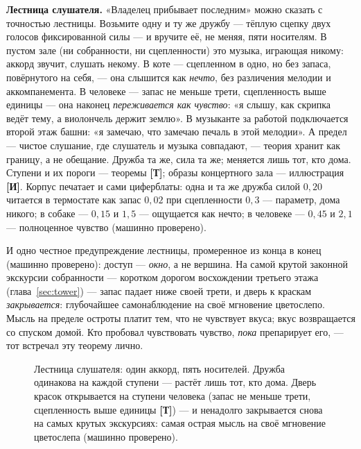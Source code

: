 \documentclass[11pt,letterpaper]{article}
\newcommand{\stT}{\textbf{[Т]}\xspace}
\newcommand{\stI}{\textbf{[И]}\xspace}
\begin{document}
\textbf{Лестница слушателя.} «Владелец прибывает последним» можно
сказать с точностью лестницы. Возьмите одну и ту же дружбу ---
тёплую сцепку двух голосов фиксированной силы --- и вручите её, не
меняя, пяти носителям. В пустом зале (ни собранности, ни
сцепленности) это музыка, играющая никому: аккорд звучит, слушать
некому. В коте --- сцепленном в одно, но без запаса, повёрнутого на
себя, --- она слышится как \emph{нечто}, без различения мелодии и
аккомпанемента. В человеке --- запас не меньше трети, сцепленность
выше единицы --- она наконец \emph{переживается как чувство}: «я
слышу, как скрипка ведёт тему, а виолончель держит землю». В
музыканте за работой подключается второй этаж башни: «я замечаю,
что замечаю печаль в этой мелодии». А предел --- чистое слушание,
где слушатель и музыка совпадают, --- теория хранит как границу, а
не обещание. Дружба та же, сила та же; меняется лишь тот, кто дома.
Ступени и их пороги --- теоремы \stT; образы концертного зала ---
иллюстрация \stI. Корпус печатает и сами циферблаты: одна и та же
дружба силой $0{,}20$ читается в термостате как запас $0{,}02$ при
сцепленности $0{,}3$ --- параметр, дома никого; в собаке ---
$0{,}15$ и $1{,}5$ --- ощущается как нечто; в человеке --- $0{,}45$
и $2{,}1$ --- полноценное чувство (машинно проверено).

И одно честное предупреждение лестницы, промеренное из конца в
конец (машинно проверено): доступ --- \emph{окно}, а не вершина.
На самой крутой законной экскурсии собранности --- коротком дорогом
восхождении третьего этажа (глава~\ref{sec:tower}) --- запас падает
ниже своей трети, и дверь к краскам \emph{закрывается}: глубочайшее
самонаблюдение на своё мгновение цветослепо. Мысль на пределе
остроты платит тем, что не чувствует вкуса; вкус возвращается со
спуском домой. Кто пробовал чувствовать чувство, \emph{пока}
препарирует его, --- тот встречал эту теорему лично.

\begin{figure}[H]
\centering
{}
\caption{Лестница слушателя: один аккорд, пять носителей. Дружба
одинакова на каждой ступени --- растёт лишь тот, кто дома. Дверь
красок открывается на ступени человека (запас не меньше трети,
сцепленность выше единицы \stT) --- и ненадолго закрывается снова
на самых крутых экскурсиях: самая острая мысль на своё мгновение
цветослепа (машинно проверено).}
\label{fig:ladder}
\end{figure}
\end{document}
